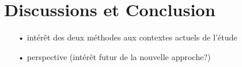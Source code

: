 \section{Discussions et Conclusion}

	\begin{itemize}
		\item[•] intérêt des deux méthodes aux contextes actuels de l'étude
		\item[•] perspective (intérêt futur de la nouvelle approche?) 
	\end{itemize}